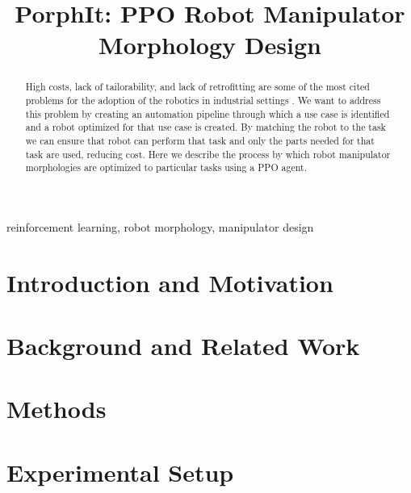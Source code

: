 \documentclass[conference]{IEEEtran}
\begin{document}
\title{PorphIt: PPO Robot Manipulator Morphology Design}

\author{
\and
{}
}

\maketitle

\begin{abstract}
High costs, lack of tailorability, and lack of retrofitting are some of the most cited problems for the adoption of the robotics in industrial settings \cite{mckinsey2019industrial}.
We want to address this problem by creating an automation pipeline through which a use case is identified and a robot optimized for that use case is created.
By matching the robot to the task we can ensure that robot can perform that task and only the parts needed for that task are used, reducing cost.
Here we describe the process by which robot manipulator morphologies are optimized to particular tasks using a PPO agent.
\end{abstract}

\begin{IEEEkeywords}
reinforcement learning, robot morphology, manipulator design
\end{IEEEkeywords}

\section{Introduction and Motivation}

\section{Background and Related Work}

\section{Methods}

\section{Experimental Setup}
\end{document}
